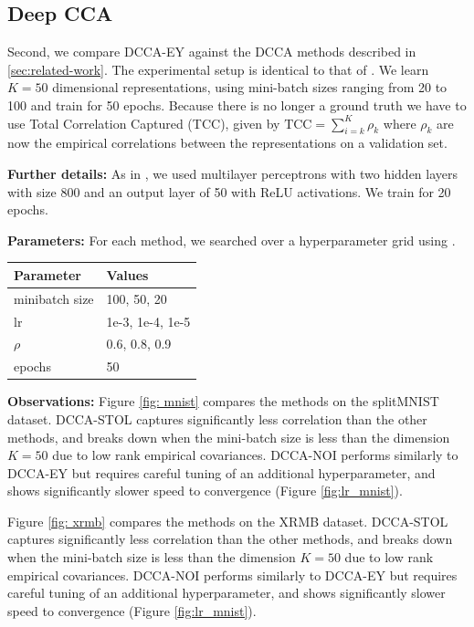 
\subsection{Deep CCA}\label{sec:experiments-DCCA}
Second, we compare DCCA-EY against the DCCA methods described in \cref{sec:related-work}. The experimental setup is identical to that of \cite{wang2015stochastic}.
We learn $K=50$ dimensional representations, using mini-batch sizes ranging from 20 to 100 and train for 50 epochs.
Because there is no longer a ground truth we have to use Total Correlation Captured (TCC), given by \( \text{TCC} = \sum_{i=k}^K \rho_k \) where $\rho_k$ are now the empirical correlations between the representations on a validation set.

\textbf{Further details:} As in \citet{wang2015stochastic}, we used multilayer perceptrons with two hidden layers with size 800 and an output layer of 50 with ReLU activations. We train for 20 epochs.

\textbf{Parameters:} For each method, we searched over a hyperparameter grid using \citet{wandb}.

\begin{table}[h!]
    \centering
    \begin{tabular}{|l|l|}
        \hline Parameter           & Values           \\
        \hline minibatch size      & 100, 50, 20      \\
        \hline lr                  & 1e-3, 1e-4, 1e-5 \\
        \hline $\rho$\footnotemark & 0.6, 0.8, 0.9    \\
        \hline epochs              & 50               \\
        \hline
    \end{tabular}
\end{table}

\textbf{Observations:}
Figure \ref{fig: mnist} compares the methods on the splitMNIST dataset.
DCCA-STOL captures significantly less correlation than the other methods, and breaks down when the mini-batch size is less than the dimension $K=50$ due to low rank empirical covariances.
DCCA-NOI performs similarly to DCCA-EY but requires careful tuning of an additional hyperparameter, and shows significantly slower speed to convergence (Figure \ref{fig:lr_mnist}).

Figure \ref{fig: xrmb} compares the methods on the XRMB dataset.
DCCA-STOL captures significantly less correlation than the other methods, and breaks down when the mini-batch size is less than the dimension $K=50$ due to low rank empirical covariances.
DCCA-NOI performs similarly to DCCA-EY but requires careful tuning of an additional hyperparameter, and shows significantly slower speed to convergence (Figure \ref{fig:lr_mnist}).

